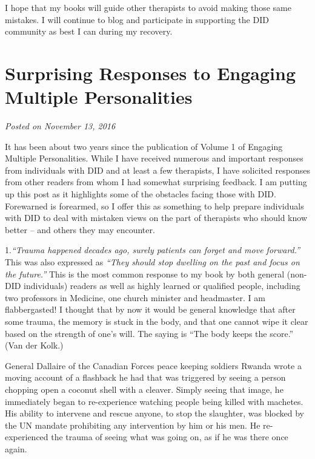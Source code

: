 \documentclass[]{book}
\begin{document}
I hope that my books will guide other therapists to avoid making those same mistakes. I will continue to blog and participate in supporting the DID community as best I can during my recovery.

\hypertarget{surprising-responses-to-engaging-multiple-personalities}{%
\section{Surprising Responses to Engaging Multiple Personalities}\label{surprising-responses-to-engaging-multiple-personalities}}

\emph{Posted on November 13, 2016}

It has been about two years since the publication of Volume 1 of Engaging Multiple Personalities. While I have received numerous and important responses from individuals with DID and at least a few therapists, I have solicited responses from other readers from whom I had somewhat surprising feedback. I am putting up this post as it highlights some of the obstacles facing those with DID. Forewarned is forearmed, so I offer this as something to help prepare individuals with DID to deal with mistaken views on the part of therapists who should know better -- and others they may encounter.

1.\emph{``Trauma happened decades ago, surely patients can forget and move forward.''} This was also expressed as \emph{``They should stop dwelling on the past and focus on the future.''} This is the most common response to my book by both general (non-DID individuals) readers as well as highly learned or qualified people, including two professors in Medicine, one church minister and headmaster. I am flabbergasted! I thought that by now it would be general knowledge that after some trauma, the memory is stuck in the body, and that one cannot wipe it clear based on the strength of one's will. The saying is ``The body keeps the score.'' (Van der Kolk.)

General Dallaire of the Canadian Forces peace keeping soldiers Rwanda wrote a moving account of a flashback he had that was triggered by seeing a person chopping open a coconut shell with a cleaver. Simply seeing that image, he immediately began to re-experience watching people being killed with machetes. His ability to intervene and rescue anyone, to stop the slaughter, was blocked by the UN mandate prohibiting any intervention by him or his men. He re-experienced the trauma of seeing what was going on, as if he was there once again.
\end{document}

